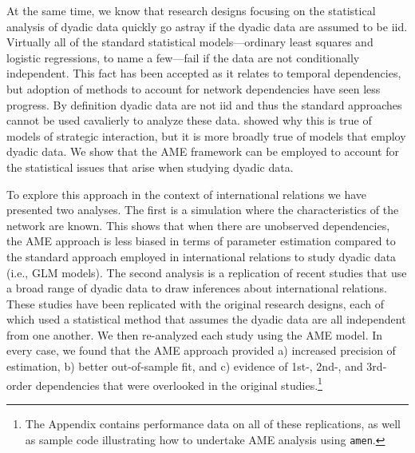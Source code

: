 \documentclass[12pt]{amsart}
\begin{document}
At the same time, we know that research designs focusing on the statistical analysis of dyadic data quickly go astray if the dyadic data are assumed to be iid.  Virtually all of the standard statistical models---ordinary least squares and logistic regressions, to name a few---fail if the data are not conditionally independent. This fact has been accepted as it relates to temporal dependencies, but adoption of methods to account for network dependencies have seen less progress. By definition dyadic data are not iid and thus the standard approaches cannot be used cavalierly to analyze these data. \citet{signorino:1999} showed why this is true of models of strategic interaction, but it is more broadly true of models that employ dyadic data.  We show that the AME framework can be employed to account for the statistical issues that arise when studying dyadic data.

To explore this approach in the context of international relations we have presented two analyses. The first is a simulation where the characteristics of the network are known. This shows that when there are unobserved dependencies, the AME approach is less biased in terms of parameter estimation compared to the standard approach employed in international relations to study dyadic data (i.e., GLM models). The second analysis is a replication of recent studies that use a broad range of dyadic data to draw inferences about international relations.  These studies have been replicated with the original research designs, each of which used a statistical method that assumes the dyadic data are all independent from one another.  We then re-analyzed each study using the AME model.  In every case, we found that the AME approach provided a) increased precision of estimation, b) better out-of-sample fit, and c) evidence of 1st-, 2nd-, and 3rd-order dependencies that were overlooked in the original studies.\footnote{The Appendix contains performance data on all of these replications, as well as sample code illustrating how to undertake AME analysis using \texttt{amen}.}


\newpage
\clearpage

% 

% 
%

% 
\end{document}
